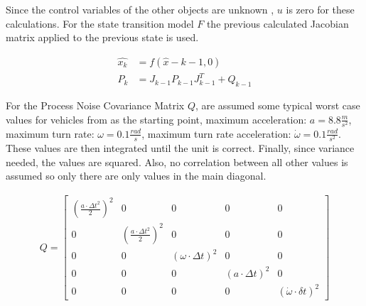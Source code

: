 \documentclass[11pt,oneside,openright]{mpreport}
\begin{document}
Since the control variables of the other objects are unknown , $u$ is zero for these calculations.
For the state transition model $F$ the previous calculated Jacobian matrix applied to the previous state is used.

\begin{align*}
\hat{x_{k}} &= f(\hat{x}-{k-1},0)\\
P_{k}&=J_{k-1} P_{k-1} {J^T_{k-1}} + Q_{k-1}
\end{align*}


For the Process Noise Covariance Matrix $Q$, are assumed some typical worst case values for vehicles from \cite{Kelly1994} as the starting point,
maximum acceleration: $a = 8.8 \frac{m}{s^2}$, maximum turn rate: $\omega = 0.1 \frac{rad}{s}$,   maximum turn rate acceleration: $\dot\omega = 0.1 \frac{rad}{s^2}$.
These values are then integrated until the unit is correct. Finally, since variance needed, the values are squared. 
Also, no correlation between all other values is assumed so only there are only values in the main diagonal.

\begin{align*}
Q=
\begin{bmatrix}
(\frac{a \cdot \Delta t^2}{2})^2 & 0 & 0 & 0 & 0\\
0 & (\frac{a \cdot \Delta t^2}{2})^2 & 0 & 0 & 0\\
0 & 0 & (\omega \cdot \Delta t)^2 & 0 & 0\\
0 & 0 & 0 & (a \cdot \Delta t)^2 & 0\\
0 & 0 & 0 & 0 & (\dot\omega \cdot \delta t)^2
\end{bmatrix} 
\end{align*}

% 
\end{document}
